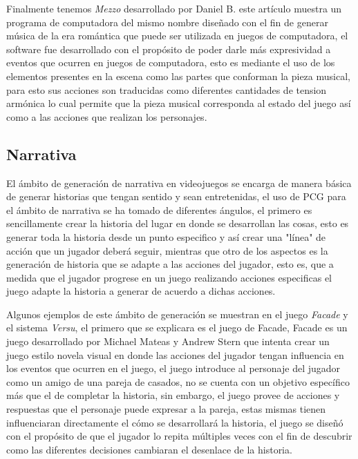 Finalmente tenemos \textit{Mezzo} desarrollado por Daniel B. este artículo muestra
un programa de computadora del mismo nombre diseñado con el fin de generar
música de la era romántica que puede ser utilizada en juegos de computadora, el
software fue desarrollado con el propósito de poder darle más expresividad a
eventos que ocurren en juegos de computadora, esto es mediante el uso de los
elementos presentes en la escena como las partes que conforman la pieza musical,
para esto sus acciones son traducidas como diferentes cantidades de tension
armónica lo cual permite que la pieza musical corresponda al estado del juego
así como a las acciones que realizan los personajes.

\subsection{Narrativa}
\label{subsection:Narrative}

El ámbito de generación de narrativa en videojuegos se encarga de manera básica
de generar historias que tengan sentido y sean entretenidas, el uso de PCG para
el ámbito de narrativa se ha tomado de diferentes ángulos, el primero es
sencillamente crear la historia del lugar en donde se desarrollan las cosas,
esto es generar toda la historia desde un punto especifico y así crear una
"línea" de acción que un jugador deberá seguir, mientras que otro de los
aspectos es la generación de historia que se adapte a las acciones del jugador,
esto es, que a medida que el jugador progrese en un juego realizando acciones
especificas el juego adapte la historia a generar de acuerdo a dichas acciones.

Algunos ejemplos de este ámbito de generación se muestran en el juego
\textit{Facade} y el sistema \textit{Versu}, el primero que se explicara es el
juego de Facade, Facade es un juego desarrollado por Michael Mateas y Andrew
Stern \cite{mateas2003faccade} que intenta crear un juego estilo novela visual
en donde las acciones del jugador tengan influencia en los eventos que ocurren
en el juego, el juego introduce al personaje del jugador como un amigo de una
pareja de casados, no se cuenta con un objetivo específico más que el de
completar la historia, sin embargo, el juego provee de acciones y respuestas que
el personaje puede expresar a la pareja, estas mismas tienen influenciaran
directamente el cómo se desarrollará la historia, el juego se diseñó con el
propósito de que el jugador lo repita múltiples veces con el fin de descubrir
como las diferentes decisiones cambiaran el desenlace de la historia. 

